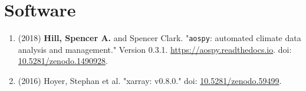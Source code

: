 \documentclass[12pt,letterpaper]{shillcv}
\begin{document}
\section*{Software}
\label{sec:orgf9d1656}
\begin{enumerate}
\item (2018) \textbf{Hill, Spencer A.} and Spencer Clark.  "\texttt{aospy}: automated climate
data analysis and management."  Version 0.3.1.  \url{https://aospy.readthedocs.io}.
doi: \href{https://doi.org/10.5281/zenodo.1490928}{10.5281/zenodo.1490928}.
\item (2016) Hoyer, Stephan et al.  "xarray: v0.8.0."  doi: \href{https://doi.org/10.5281/zenodo.59499}{10.5281/zenodo.59499}.
\end{enumerate}
\end{document}
